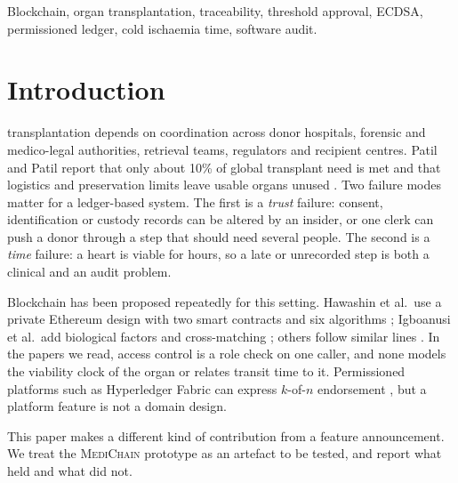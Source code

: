 \documentclass[journal]{IEEEtran}
\newcommand{\mc}{\textsc{MediChain}}
\begin{document}
\begin{IEEEkeywords}
Blockchain, organ transplantation, traceability, threshold approval,
ECDSA, permissioned ledger, cold ischaemia time, software audit.
\end{IEEEkeywords}

\section{Introduction}
 transplantation depends on coordination across
donor hospitals, forensic and medico-legal authorities, retrieval teams,
regulators and recipient centres. Patil and Patil report that only about
10\% of global transplant need is met and that logistics and preservation
limits leave usable organs unused \cite{patil2026}. Two failure modes
matter for a ledger-based system. The first is a \emph{trust} failure:
consent, identification or custody records can be altered by an insider, or
one clerk can push a donor through a step that should need several people.
The second is a \emph{time} failure: a heart is viable for hours, so a late
or unrecorded step is both a clinical and an audit problem.

Blockchain has been proposed repeatedly for this setting. Hawashin et
al.\ use a private Ethereum design with two smart contracts and six
algorithms \cite{hawashin2022}; Igboanusi et al.\ add biological factors and
cross-matching \cite{boms2024}; others follow similar lines
\cite{sitharamulu2024,bharali2026}. In the papers we read, access control is
a role check on one caller, and none models the viability clock of the organ
or relates transit time to it. Permissioned platforms such as Hyperledger
Fabric can express $k$-of-$n$ endorsement \cite{fabric2018}, but a platform
feature is not a domain design.

This paper makes a different kind of contribution from a feature
announcement. We treat the \mc{} prototype as an artefact to be tested, and
report what held and what did not.
\end{document}
